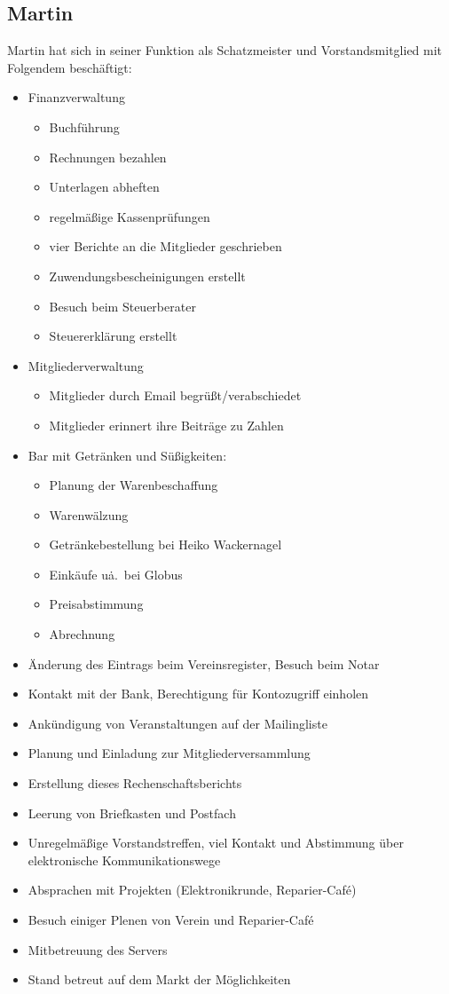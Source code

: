 \documentclass[ngerman,10pt,DIV16]{scrartcl}
\begin{document}
\subsection{Martin}
Martin hat sich in seiner Funktion als Schatzmeister und Vorstandsmitglied mit Folgendem beschäftigt:
\begin{itemize}
	\item Finanzverwaltung
	\begin{itemize}
		\item Buchführung
		\item Rechnungen bezahlen
		\item Unterlagen abheften
		\item regelmäßige Kassenprüfungen
		\item vier Berichte an die Mitglieder geschrieben
		\item Zuwendungsbescheinigungen erstellt
		\item Besuch beim Steuerberater
		\item Steuererklärung erstellt
	\end{itemize}
	\item Mitgliederverwaltung
	\begin{itemize}
		\item Mitglieder durch Email begrüßt/verabschiedet
		\item Mitglieder erinnert ihre Beiträge zu Zahlen
	\end{itemize}
	\item Bar mit Getränken und Süßigkeiten:
	\begin{itemize}
		\item Planung der Warenbeschaffung
		\item Warenwälzung
		\item Getränkebestellung bei Heiko Wackernagel
		\item Einkäufe u\.a.\ bei Globus
		\item Preisabstimmung
		\item Abrechnung
	\end{itemize}
	\item Änderung des Eintrags beim Vereinsregister, Besuch beim Notar
	\item Kontakt mit der Bank, Berechtigung für Kontozugriff einholen
	\item Ankündigung von Veranstaltungen auf der Mailingliste
	\item Planung und Einladung zur Mitgliederversammlung
	\item Erstellung dieses Rechenschaftsberichts
	\item Leerung von Briefkasten und Postfach
	\item Unregelmäßige Vorstandstreffen, viel Kontakt und Abstimmung über elektronische Kommunikationswege
	\item Absprachen mit Projekten (Elektronikrunde, Reparier-Café)
	\item Besuch einiger Plenen von Verein und Reparier-Café
	\item Mitbetreuung des Servers
	\item Stand betreut auf dem Markt der Möglichkeiten
\end{itemize}
\end{document}
